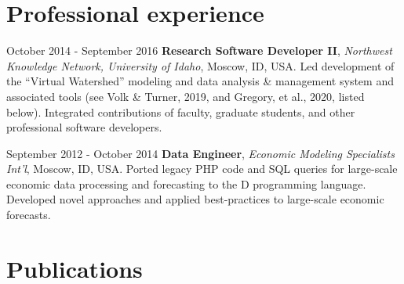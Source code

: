 \documentclass[letterpaper,11pt,oneside]{article}
\begin{document}
\noindent
\section*{\textcolor{gunmetal}{Professional experience}}

  \begin{hangparas}{0.25in}{1}
    October 2014 - September 2016 \hspace{-0.555em} \quad\textbf{Research Software Developer II}, 
        \emph{Northwest Knowledge Network, University of Idaho}, Moscow, ID, USA. Led development of the ``Virtual Watershed'' modeling and data analysis \&
        management system and associated tools (see Volk \& Turner, 2019, and 
        Gregory, et al., 2020, listed below). 
        Integrated contributions of faculty, graduate students,
        and other professional software developers.

      September 2012 - October 2014 \quad \textbf{Data Engineer}, 
      \emph{Economic Modeling Specialists Int'l}, Moscow, ID, USA.
      Ported legacy PHP code and SQL queries for large-scale 
      economic data processing
      and forecasting to the D programming language. 
      Developed novel approaches and applied best-practices to large-scale
      economic forecasts.

  \end{hangparas}

\noindent


\noindent
\section*{\textcolor{gunmetal}{Publications}}
\end{document}
